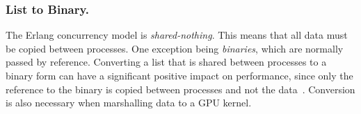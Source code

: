 \documentclass[final]{jfp1}
\begin{document}



\vspace{-6pt}
\subsubsection{List to Binary.}
\vspace{-6pt}
\label{sec:listToBinary}
The Erlang concurrency model is
\emph{shared-nothing}. %
This means that all data must be copied between processes. One exception being
\emph{binaries}, which are normally passed by reference.
Converting a list that is shared between processes to a binary form can have a significant
positive impact on performance, since only the reference to the binary is copied between processes and not the data~\cite{Barwell:2016:TSD}.
Conversion is also necessary when marshalling data to a GPU kernel.
\end{document}
